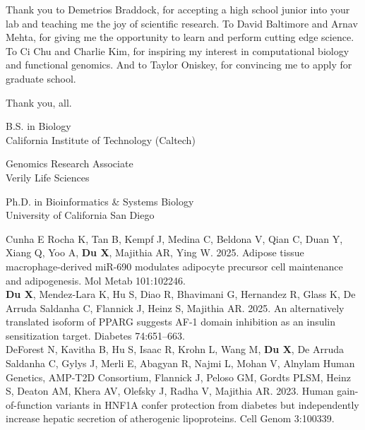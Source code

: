 \documentclass[11pt]{formatting-template}
\begin{document}
\begin{acknowledgements}
Thank you to Demetrios Braddock, for accepting a high school junior into your lab and teaching me the joy of scientific research. To David Baltimore and Arnav Mehta, for giving me the opportunity to learn and perform cutting edge science. To Ci Chu and Charlie Kim, for inspiring my interest in computational biology and functional genomics. And to Taylor Oniskey, for convincing me to apply for graduate school.	

Thank you, all. 
\end{acknowledgements}

\begin{vita}
\noindent
\begin{cv}{}
\begin{cvlist}{}
	\item[2012--2016] B.S. in Biology\\
		California Institute of Technology (Caltech)
	\item[2016--2019] Genomics Research Associate\\
		Verily Life Sciences
	\item[2019--2026] Ph.D. in Bioinformatics \& Systems Biology\\
		University of California San Diego
\end{cvlist}
\end{cv}

\publications{}

\noindent Cunha E Rocha K, Tan B, Kempf J, Medina C, Beldona V, Qian C, Duan Y, Xiang Q, Yoo A, \textbf{Du X}, Majithia AR, Ying W. 2025. Adipose tissue macrophage-derived miR-690 modulates adipocyte precursor cell maintenance and adipogenesis. Mol Metab 101:102246.
\\

\noindent \textbf{Du X}, Mendez-Lara K, Hu S, Diao R, Bhavimani G, Hernandez R, Glass K, De Arruda Saldanha C, Flannick J, Heinz S, Majithia AR. 2025. An alternatively translated isoform of PPARG suggests AF-1 domain inhibition as an insulin sensitization target. Diabetes 74:651–663.
\\

\noindent DeForest N, Kavitha B, Hu S, Isaac R, Krohn L, Wang M, \textbf{Du X}, De Arruda Saldanha C, Gylys J, Merli E, Abagyan R, Najmi L, Mohan V, Alnylam Human Genetics, AMP-T2D Consortium, Flannick J, Peloso GM, Gordts PLSM, Heinz S, Deaton AM, Khera AV, Olefsky J, Radha V, Majithia AR. 2023. Human gain-of-function variants in HNF1A confer protection from diabetes but independently increase hepatic secretion of atherogenic lipoproteins. Cell Genom 3:100339.
\\


\end{vita}
\end{document}
